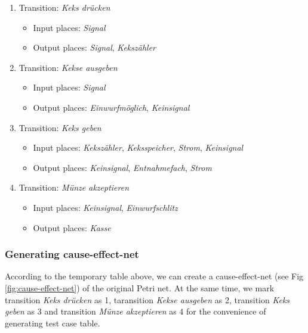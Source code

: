 \begin{enumerate}
    \item Transition: \emph{Keks drücken}
    \begin{itemize}
        \item Input places: \emph{Signal}
        \item Output places: \emph{Signal}, \emph{Kekszähler}
    \end{itemize}
    \item Transition: \emph{Kekse ausgeben}
    \begin{itemize}
        \item Input places: \emph{Signal}
        \item Output places: \emph{Einwurfmöglich}, \emph{Keinsignal}
    \end{itemize}
    \item Transition: \emph{Keks geben}
    \begin{itemize}
        \item Input places: \emph{Kekszähler}, \emph{Keksspeicher}, \emph{Strom}, \emph{Keinsignal}
        \item Output places: \emph{Keinsignal}, \emph{Entnahmefach}, \emph{Strom}
    \end{itemize}
    \item Transition: \emph{Münze akzeptieren}
    \begin{itemize}
        \item Input places: \emph{Keinsignal}, \emph{Einwurfschlitz}
        \item Output places: \emph{Kasse}
    \end{itemize}
\end{enumerate}

\subsubsection{Generating cause-effect-net}
According to the temporary table above, we can create a cause-effect-net (see Fig \ref{fig:cause-effect-net}) of the original Petri net. At the same time, we mark transition \emph{Keks drücken} as 1, taransition \emph{Kekse ausgeben} as 2, transition \emph{Keks geben} as 3 and transition \emph{Münze akzeptieren} as 4 for the convenience of generating test case table.

